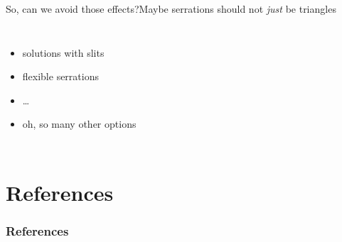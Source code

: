 \documentclass[xcolor=table,aspectratio=169]{beamer}
\renewcommand\bibfont{\scriptsize}
\begin{document}
\begin{frame}{So, can we avoid those effects?}{Maybe serrations should not \emph{just} be triangles}
    \begin{columns}
        \begin{itemize}
            \item solutions with slits
            \item flexible serrations
            \item \ldots
            \item oh, so many other options
        \end{itemize}
    \end{columns}
\end{frame}

\ClosePresentation

\section{References}
\renewcommand*{\bibfont}{\tiny}
\begin{frame}[allowframebreaks]
    \frametitle{References}
    \tiny{}
    
\end{frame}
\end{document}
